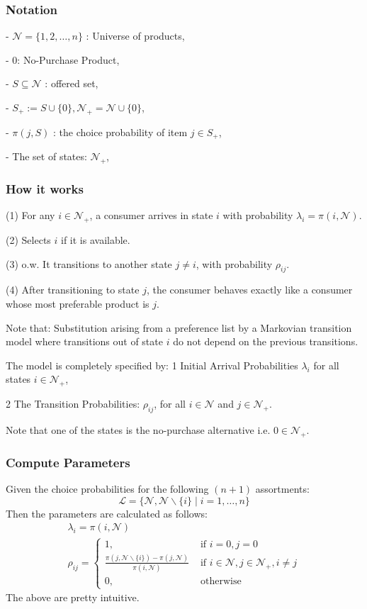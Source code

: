 \documentclass[11pt,a4paper]{article}
\begin{document}
\subsubsection{Notation}
- $\mathcal{N}=\{1,2, \ldots, n\}$ : Universe of products,

- 0: No-Purchase Product,

- $S \subseteq \mathcal{N}$ : offered set,

- $S_{+}:=S \cup\{0\}, \mathcal{N}_{+}=\mathcal{N} \cup\{0\}$,

- $\pi(j, S)$ : the choice probability of item $j \in S_{+}$,

- The set of states: $\mathcal{N}_{+}$,

\subsubsection{How it works}
(1) For any $i \in \mathcal{N}_{+}$, a consumer arrives in state $i$ with probability $\lambda_{i}=\pi(i, \mathcal{N})$.

(2) Selects $i$ if it is available.

(3) o.w. It transitions to another state $j \neq i$, with probability $\rho_{i j}$.

(4) After transitioning to state $j$, the consumer behaves exactly like a consumer whose most preferable product is $j$.

Note that: Substitution arising from a preference list by a Markovian transition model where transitions out of state $i$ do not depend on the previous transitions.

The model is completely specified by:
1 Initial Arrival Probabilities $\lambda_{i}$ for all states $i \in \mathcal{N}_+$,

2 The Transition Probabilities: $\rho_{ij}$, for all $i \in \mathcal{N}$ and $j \in \mathcal{N}_+$.

Note that one of the states is the no-purchase alternative i.e. $0 \in \mathcal{N}_+$.

\subsubsection{Compute Parameters}
Given the choice probabilities for the following $(n+1)$ assortments:
$$
\mathcal{L}=\{\mathcal{N}, \mathcal{N} \backslash\{i\} \mid i=1, \ldots, n\}
$$
Then the parameters are calculated as follows:
$$
\begin{gathered}
\lambda_{i}=\pi(i, \mathcal{N}) \\
\rho_{i j}= \begin{cases}1, & \text { if } i=0, j=0 \\
\frac{\pi(j, \mathcal{N} \backslash\{i\})-\pi(j, \mathcal{N})}{\pi(i, \mathcal{N})} & \text { if } i \in \mathcal{N}, j \in \mathcal{N}_{+}, i \neq j \\
0, & \text { otherwise }\end{cases}
\end{gathered}
$$
The above are pretty intuitive.
\end{document}
